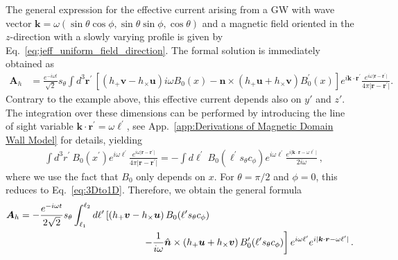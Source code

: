 \documentclass[a4paper,11pt]{article}
\begin{document}
The general expression for the effective current arising from a GW with wave vector $\bm{k} = \omega  ( \sin \theta \cos \phi, \sin \theta \sin \phi, \cos \theta )$ and a magnetic field oriented in the $z$-direction with a slowly varying profile is given by Eq.~\eqref{eq:jeff_uniform_field_direction}. The formal solution is immediately obtained as
%
\begin{align}
     \bm{A}_{h} 
     & =  \frac{e^{- i \omega t}}{ \sqrt{2}  }  s_{\theta}    \int d^{3} \bm{r}^{\prime}   \, \left[ 
 \left(  h_{+} \bm{v} - h_{\times} \bm{u}  \right) i \omega B_{0}(x)  - \bm{n} \times (h_{+} \bm{u} + h_{\times} \bm{v} )  B_{0}^{\prime}(x) \right]  e^{i \bm{k} \cdot \bm{r}^{\prime} }  \frac{e^{i \omega \vert \bm{r} - \bm{r}^{\prime} \vert} }{ 4 \pi \vert \bm{r} - \bm{r}^{\prime} \vert }.
 \label{eq:MD_Greens_2}
\end{align}
%
Contrary to the example above, this effective current depends also on $y'$ and $z'$. The integration over these dimensions can be performed by introducing the line of sight variable $ \bm{k} \cdot \bm{r}^{\prime} = \omega \ell^{\prime} $, see App.~\ref{app:Derivations of Magnetic Domain Wall Model} for details, yielding
%
\begin{align}
&\int  d^{3}r^{\prime} ~B_{0} (x^{\prime}) e^{i \omega \ell^{\prime}} \frac{e^{i \omega \vert \bm{r} - \bm{r}^{\prime} \vert} }{ 4 \pi \vert \bm{r} - \bm{r}^{\prime} \vert } = - \int d\ell^{\prime}   ~B_{0}(\ell^{\prime} s_{\theta} c_{\phi} ) e^{i \omega \ell^{\prime}}  \frac{e^{i \vert \bm{k} \cdot \bm{r} - \omega \ell^{\prime} \vert  }}{  2 i \omega } \,,
\label{eq:integration}
\end{align}
%
where we use the fact that $ B_{0} $ only depends on $ x $. For $ \theta = \pi/2$ and $ \phi = 0$, this reduces to Eq.~\eqref{eq:3Dto1D}.
%
Therefore, we obtain the general formula
\begin{equation}
\begin{aligned}
    \bm{A}_{h} 
    &  = 
-\frac{e^{- i \omega t}}{2\sqrt{2}}  s_{\theta} \int_{\ell_{1}}^{\ell_{2}} d\ell^{\prime}  \left[  \left(  h_{+} \bm{v} - h_{\times} \bm{u}  \right)  B_{0}(\ell^{\prime} s_{\theta} c_{\phi}) \right. \\
& \hspace{4.5cm} \left.
- \frac{1}{i \omega}  \hat{\bm{n}} \times \left(  h_{+} \bm{u} + h_{\times} \bm{v}  \right)  B_{0}^{\prime}(\ell^{\prime} s_{\theta} c_{\phi})  \right] 
e^{i \omega \ell^{\prime}}  e^{i \vert \bm{k} \cdot \bm{r} - \omega \ell^{\prime} \vert  } 
\,.
\end{aligned}
\label{eq:general_sol_domain}
\end{equation}
\end{document}
